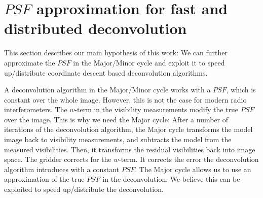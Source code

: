 \section{$PSF$ approximation for fast and distributed deconvolution} \label{gradients}
This section describes our main hypothesis of this work: We can further approximate the $PSF$ in the Major/Minor cycle and exploit it to speed up/distribute coordinate descent based deconvolution algorithms.

A deconvolution algorithm in the Major/Minor cycle works with a $PSF$, which is constant over the whole image. However, this is not the case for modern radio interferometers. The $w$-term in the visibility measurements modify the true $PSF$ over the image. This is why we need the Major cycle: After a number of iterations of the deconvolution algorithm, the Major cycle transforms the model image back to visibility measurements, and subtracts the model from the measured visibilities. Then, it transforms the residual visibilities back into image space. The gridder corrects for the $w$-term. It corrects the error the deconvolution algorithm introduces with a constant $PSF$. The Major cycle allows us to use an approximation of the true $PSF$ in the deconvolution. We believe this can be exploited to speed up/distribute the deconvolution.

